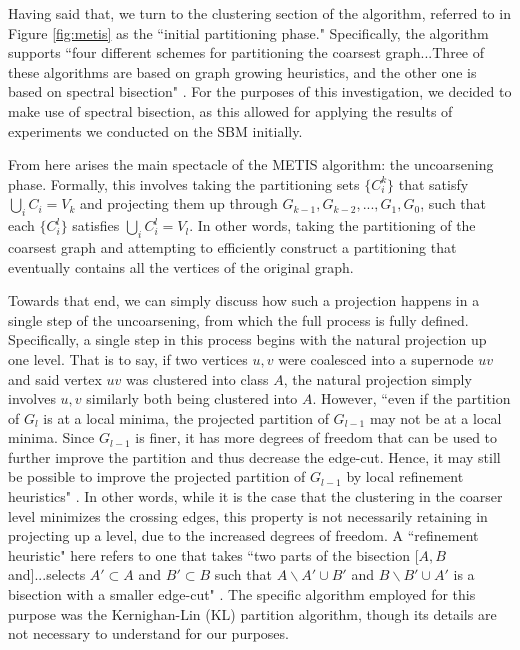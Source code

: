 \documentclass{article}
\begin{document}
Having said that, we turn to the clustering section of the algorithm, referred to in Figure \ref{fig:metis} as the ``initial partitioning phase." Specifically, the algorithm supports ``four different schemes for partitioning the coarsest graph...Three of these algorithms are based on graph growing heuristics, and the other one is based on spectral bisection" \cite{metis}. For the purposes of this investigation, we decided to make use of spectral bisection, as this allowed for applying the results of experiments we conducted on the SBM initially. 

From here arises the main spectacle of the METIS algorithm: the uncoarsening phase. Formally, this involves taking the partitioning sets $\{C^k_i\}$ that satisfy $\bigcup_i C_i = V_k$ and projecting them up through $G_{k-1},G_{k-2},...,G_1,G_0$, such that each $\{C^l_i\}$ satisfies $\bigcup_i C^l_i = V_l$. In other words, taking the partitioning of the coarsest graph and attempting to efficiently construct a partitioning that eventually contains all the vertices of the original graph.

Towards that end, we can simply discuss how such a projection happens in a single step of the uncoarsening, from which the full process is fully defined. Specifically, a single step in this process begins with the natural projection up one level. That is to say, if two vertices $u,v$ were coalesced into a supernode $uv$ and said vertex $uv$ was clustered into class $A$, the natural projection simply involves $u,v$ similarly both being clustered into $A$. However, ``even if the partition of $G_l$ is at a local minima, the projected partition of $G_{l−1}$ may not be at a local minima. Since $G_{l−1}$ is finer, it has more degrees of freedom that can be used to further improve the partition and thus decrease the edge-cut. Hence, it may still be possible to improve the projected partition of $G_{l−1}$ by local refinement heuristics" \cite{metis}. In other words, while it is the case that the clustering in the coarser level minimizes the crossing edges, this property is not necessarily retaining in projecting up a level, due to the increased degrees of freedom. A ``refinement heuristic" here refers to one that takes ``two parts of the bisection [$A, B$ and]...selects $A'\subset A$ and $B'\subset B$ such that $A\backslash A' \cup B'$ and $B\backslash B' \cup A'$ is a bisection with a smaller edge-cut" \cite{metis}. The specific algorithm employed for this purpose was the Kernighan-Lin (KL) partition algorithm, though its details are not necessary to understand for our purposes.
\end{document}
